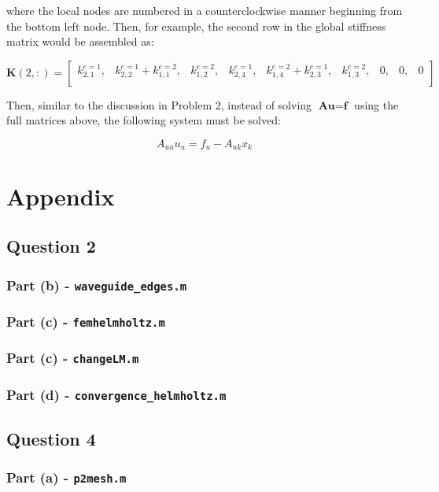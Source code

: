 \documentclass[10pt]{article}
\newcommand{\beq}{\begin{equation}}
\newcommand{\eeq}{\end{equation}}
\begin{document}
where the local nodes are numbered in a counterclockwise manner beginning from the bottom left node. Then, for example, the second row in the global stiffness matrix would be assembled as:

\begin{equation}
\textbf{K}(2,:)=\begin{bmatrix}
k_{2,1}^{e=1}, & k_{2,2}^{e=1}+k_{1,1}^{e=2}, & k_{1,2}^{e=2}, & k_{2,4}^{e=1}, & k_{1,4}^{e=2}+k_{2,3}^{e=1}, & k_{1,3}^{e=2}, & 0, & 0, & 0\\
\end{bmatrix}
\end{equation}

Then, similar to the discussion in Problem 2, instead of solving \(\textbf{A}\textbf{u}=\textbf{f}\) using the full matrices above, the following system must be solved:

\beq
A_{uu}u_u=f_u-A_{uk}x_k
\eeq


\section{Appendix}
\subsection{Question 2}
\subsubsection{Part (b) - {\tt waveguide\_edges.m}}

\subsubsection{Part (c) - {\tt femhelmholtz.m}}

\subsubsection{Part (c) - {\tt changeLM.m}}

\subsubsection{Part (d) - {\tt convergence\_helmholtz.m}}

\subsection{Question 4}
\subsubsection{Part (a) - {\tt p2mesh.m}}

\end{document}
